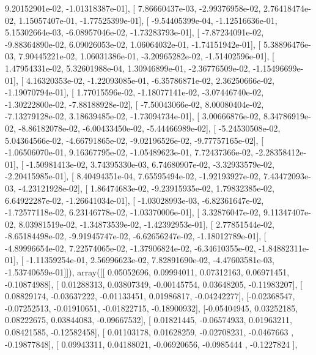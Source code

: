 \documentclass{article}
\begin{document}
          9.20152901e-02,  -1.01318387e-01],
       [  7.86660437e-03,  -2.99376958e-02,   2.76418474e-02,
          1.15057407e-01,  -1.77525399e-01],
       [ -9.54405399e-04,  -1.12516636e-01,   5.15302664e-03,
         -6.08957046e-02,  -1.73283793e-01],
       [ -7.87234091e-02,  -9.88364890e-02,   6.09026053e-02,
          1.06064032e-01,  -1.74151942e-01],
       [  5.38896476e-03,   7.90445221e-02,   1.06031386e-01,
         -3.20965282e-02,  -1.51402596e-01],
       [  1.47954331e-02,   5.32601988e-04,   1.30946899e-01,
         -2.36776509e-02,  -1.15496699e-01],
       [  4.16320353e-02,  -1.22093085e-01,  -6.35786871e-02,
          2.36250666e-02,  -1.19070794e-01],
       [  1.77015596e-02,  -1.18077141e-02,  -3.07446740e-02,
         -1.30222800e-02,  -7.88188928e-02],
       [ -7.50043066e-02,   8.00080404e-02,  -7.13279128e-02,
          3.18639485e-02,  -1.73094734e-01],
       [  3.00666876e-02,   8.34786919e-02,  -8.86182078e-02,
         -6.00433450e-02,  -5.44466989e-02],
       [ -5.24530508e-02,   5.04364566e-02,  -4.66791865e-02,
         -9.02196526e-02,  -9.77757165e-02],
       [ -1.06506070e-01,   9.16367795e-02,  -1.05489623e-01,
          7.72437366e-02,  -2.28358412e-01],
       [ -1.50981413e-02,   3.74395330e-03,   6.74680907e-02,
         -3.32933579e-02,  -2.20415985e-01],
       [  8.40494351e-04,   7.65595494e-02,  -1.92193927e-02,
          7.43472093e-03,  -4.23121928e-02],
       [  1.86474683e-02,  -9.23915935e-02,   1.79832385e-02,
          6.64922287e-02,  -1.26641034e-01],
       [ -1.03028993e-03,  -6.82361647e-02,  -1.72577118e-02,
          6.23146778e-02,  -1.03370006e-01],
       [  3.32876047e-02,   9.11347407e-02,   8.03981519e-02,
         -1.34873539e-02,  -1.42392953e-01],
       [  2.77851544e-02,  -8.65184498e-02,  -9.91945747e-02,
         -6.62656247e-02,  -1.18012789e-01],
       [ -4.89996654e-02,   7.22574065e-02,  -1.37906824e-02,
         -6.34610355e-02,  -1.84882311e-01],
       [ -1.11359254e-01,   2.56996623e-02,   7.82891690e-02,
         -4.47603581e-03,  -1.53740659e-01]]), array([[ 0.05052696,  0.09994011,  0.07312163,  0.06971451, -0.10874988],
       [ 0.01288313,  0.03807349, -0.00145754,  0.03648205, -0.11983207],
       [ 0.08829174, -0.03637222, -0.01133451,  0.01986817, -0.04242277],
       [-0.02368547, -0.07252513, -0.01910651, -0.01822715, -0.18900932],
       [-0.05404945,  0.03252185,  0.08222675,  0.03844083, -0.09667532],
       [ 0.01821445, -0.06574933,  0.01963211,  0.08421585, -0.12582458],
       [ 0.01103178,  0.01628259, -0.02708231, -0.0467663 , -0.19877848],
       [ 0.09943311,  0.04188021, -0.06920656, -0.0985444 , -0.1227824 ],
\end{document}

